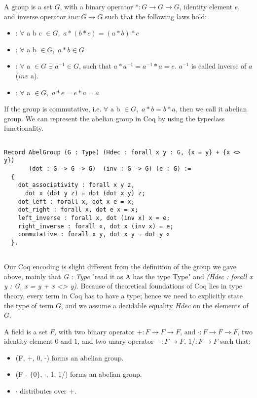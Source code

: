 \begin{definition}[Group] 
A group is a set $G$, with a binary operator $* : G \rightarrow G \rightarrow G$, identity element $e$, and inverse operator $inv : G \rightarrow G$ such 
    that the following laws hold:  \end{definition} 
    \begin{itemize}
     \item {}: $\forall$  a b c $\in G,$  $a * (b * c) = (a * b) * c$
    \item {}: $\forall$ a b $\in G,$  $a * b \in G$
    \item {}: $\forall$ a $\in G$ $\exists$ $a^{-1} \in G$, such that $a * a^{-1} = a^{-1} * a = e$. $a^{-1}$ is called inverse of $a$ ($inv$ a).
    \item {}: $\forall$ a $\in G,$  $a * e = e * a  = a$
    \end{itemize}
  
    \noindent
    If the group is commutative, i.e. $\forall$ a b $\in  G,$  $a * b = b * a$, then we call it abelian group.  We can represent the abelian group in Coq by using the 
    typeclass functionality. 
 
 
 \begin{verbatim}

Record AbelGroup (G : Type) (Hdec : forall x y : G, {x = y} + {x <> y}) 
       (dot : G -> G -> G)  (inv : G -> G) (e : G) :=
  {
    dot_associativity : forall x y z, 
      dot x (dot y z) = dot (dot x y) z;
    dot_left : forall x, dot x e = x;
    dot_right : forall x, dot e x = x;
    left_inverse : forall x, dot (inv x) x = e;
    right_inverse : forall x, dot x (inv x) = e;
    commutative : forall x y, dot x y = dot y x
  }.
  
\end{verbatim}    

\noindent
Our Coq encoding is slight different from the definition of the group we gave above, mainly that \textit{G : Type} "read it as A has the type Type" and 
\textit{(Hdec : forall x y : G, {x = y} + {x <> y})}. Because of theoretical foundations of Coq lies in type theory, every term in Coq has to have a type;
hence we need to explicitly state the type of term $G$, and we assume a decidable equality $Hdec$ on the elements of $G$.  

\begin{definition}[Field] 
A field  is a set $F$, with two binary operator $+ : F \rightarrow F \rightarrow F$,  and $\cdot : F \rightarrow F \rightarrow F$, 
two identity element $0$ and $1$, and two unary operator $- : F \rightarrow F$, $1/ : F \rightarrow F$  such that:
\end{definition} 
 \begin{itemize}
 \item (F, +, 0, -) forms an abelian group.
 \item (F - $\lbrace 0 \rbrace$, $\cdot$, 1, 1/) forms an abelian group.
 \item $\cdot$ distributes over +.
 \end{itemize}
 
